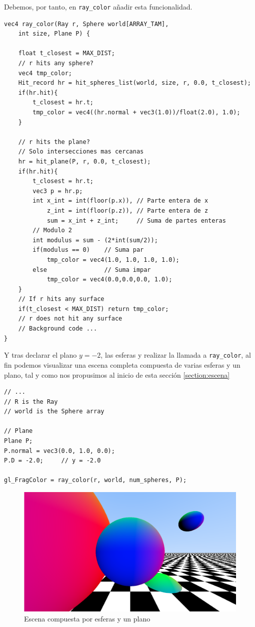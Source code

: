 Debemos, por tanto, en \verb|ray_color| añadir esta funcionalidad.

\begin{lstlisting}
vec4 ray_color(Ray r, Sphere world[ARRAY_TAM], 
    int size, Plane P) {
    
    float t_closest = MAX_DIST;   
    // r hits any sphere?
    vec4 tmp_color;
    Hit_record hr = hit_spheres_list(world, size, r, 0.0, t_closest);
    if(hr.hit){
        t_closest = hr.t;
        tmp_color = vec4((hr.normal + vec3(1.0))/float(2.0), 1.0);
    }

    // r hits the plane? 
    // Solo intersecciones mas cercanas
    hr = hit_plane(P, r, 0.0, t_closest);
    if(hr.hit){
        t_closest = hr.t;
        vec3 p = hr.p;
        int x_int = int(floor(p.x)), // Parte entera de x
            z_int = int(floor(p.z)), // Parte entera de z
            sum = x_int + z_int;     // Suma de partes enteras
        // Modulo 2
        int modulus = sum - (2*int(sum/2));
        if(modulus == 0)    // Suma par
            tmp_color = vec4(1.0, 1.0, 1.0, 1.0);
        else                // Suma impar
            tmp_color = vec4(0.0,0.0,0.0, 1.0);
    }
    // If r hits any surface
    if(t_closest < MAX_DIST) return tmp_color;
    // r does not hit any surface
    // Background code ... 
}
\end{lstlisting}

Y tras declarar el plano $y=-2$, las esferas y realizar la llamada a \verb|ray_color|, al fin podemos visualizar una escena completa compuesta de varias esferas y un plano, tal y como nos propusimos al inicio de esta sección \ref{section:escena}

\begin{lstlisting}
// ... 
// R is the Ray
// world is the Sphere array

// Plane
Plane P;
P.normal = vec3(0.0, 1.0, 0.0);
P.D = -2.0;     // y = -2.0

gl_FragColor = ray_color(r, world, num_spheres, P);
\end{lstlisting}

\begin{figure} [ht]
    \centering
    \includegraphics[scale = 0.25]{img/C7/escena-completa.png}
    \caption{Escena compuesta por esferas y un plano}
    \label{fig:escena-completa}
\end{figure}

